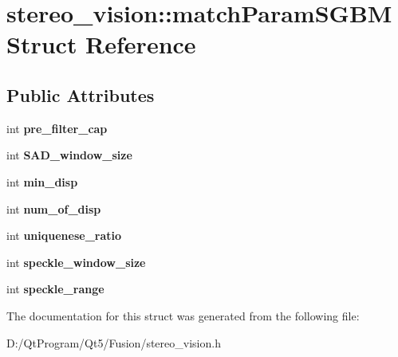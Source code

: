 \hypertarget{structstereo__vision_1_1match_param_s_g_b_m}{}\section{stereo\+\_\+vision\+:\+:match\+Param\+S\+G\+B\+M Struct Reference}
\label{structstereo__vision_1_1match_param_s_g_b_m}
\subsection*{Public Attributes}
\begin{DoxyCompactItemize}
\item 
\hypertarget{structstereo__vision_1_1match_param_s_g_b_m_a5140d9b4940a08c49e31f94360b05f7b}{}int {\bfseries pre\+\_\+filter\+\_\+cap}\label{structstereo__vision_1_1match_param_s_g_b_m_a5140d9b4940a08c49e31f94360b05f7b}

\item 
\hypertarget{structstereo__vision_1_1match_param_s_g_b_m_aae74dab15900400eb4c5e7645a482e9b}{}int {\bfseries S\+A\+D\+\_\+window\+\_\+size}\label{structstereo__vision_1_1match_param_s_g_b_m_aae74dab15900400eb4c5e7645a482e9b}

\item 
\hypertarget{structstereo__vision_1_1match_param_s_g_b_m_a986221639afed790475e61d6a5e48101}{}int {\bfseries min\+\_\+disp}\label{structstereo__vision_1_1match_param_s_g_b_m_a986221639afed790475e61d6a5e48101}

\item 
\hypertarget{structstereo__vision_1_1match_param_s_g_b_m_a6c922730bfbbd27d66ae55b88f77a3b3}{}int {\bfseries num\+\_\+of\+\_\+disp}\label{structstereo__vision_1_1match_param_s_g_b_m_a6c922730bfbbd27d66ae55b88f77a3b3}

\item 
\hypertarget{structstereo__vision_1_1match_param_s_g_b_m_a10bf5782f0dcda2d44657593bf72fb60}{}int {\bfseries uniquenese\+\_\+ratio}\label{structstereo__vision_1_1match_param_s_g_b_m_a10bf5782f0dcda2d44657593bf72fb60}

\item 
\hypertarget{structstereo__vision_1_1match_param_s_g_b_m_ac156150c87f5d1d496b029ee647c0f55}{}int {\bfseries speckle\+\_\+window\+\_\+size}\label{structstereo__vision_1_1match_param_s_g_b_m_ac156150c87f5d1d496b029ee647c0f55}

\item 
\hypertarget{structstereo__vision_1_1match_param_s_g_b_m_ace58309e7f00078e2cb28e8aeae69386}{}int {\bfseries speckle\+\_\+range}\label{structstereo__vision_1_1match_param_s_g_b_m_ace58309e7f00078e2cb28e8aeae69386}

\end{DoxyCompactItemize}


The documentation for this struct was generated from the following file\+:\begin{DoxyCompactItemize}
\item 
D\+:/\+Qt\+Program/\+Qt5/\+Fusion/stereo\+\_\+vision.\+h\end{DoxyCompactItemize}
